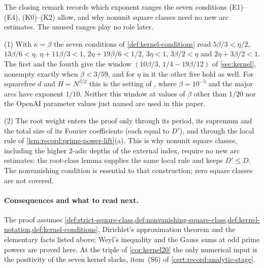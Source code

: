 The closing remark records which exponent ranges the seven
conditions (E1)--(E4), (K0)--(K2) allow, and why nonunit square
classes need no new arc estimates. The unused ranges play no role
later.

\begin{remark}\label{rem:record:K20-range}
(1) With $\kappa=\beta$ the seven conditions of \cref{def:kernel-conditions}
read $5\beta/3<\eta/2$, $13\beta/6<\eta$, $\eta+11\beta/3<1$,
$2\eta+19\beta/6<1/2$, $3\eta<1$, $3\beta/2<\eta$ and $2\eta+3\beta/2<1$. The
first and the fourth give the window $(10\beta/3,\,1/4-19\beta/12)$ of
\cref{sec:kernel}, nonempty exactly when $\beta<3/59$, and for $\eta$ in it the
other five hold as well. For squarefree $d$ and $H=N^{\beta/2}$ this is the
setting of \cite[Prop.~6.1]{OpenAI}, where $\beta=10^{-5}$ and the major arcs
have exponent $1/10$. Neither this window at values of $\beta$
other than $1/20$ nor the OpenAI parameter values just named
are used in this paper.

(2) The root weight enters the proof only through its period, its supremum
and the total size of its Fourier coefficients (each equal to $D'$), and
through the local rule of \cref{lem:record:prime-power-lift}(a). This is why
nonunit square classes, including the higher $2$-adic depths of the external
index, require no new arc estimates: the root-class lemma supplies the same
local rule and keeps $D'\le D$. The nonvanishing condition is essential to
that construction; zero square classes are not covered.
\end{remark}

\paragraph{Consequences and what to read next.}
The proof assumes \cref{def:strict-square-class,def:nonvanishing-square-class,def:kernel-notation,def:kernel-conditions},
Dirichlet's approximation
theorem and the elementary facts listed above; Weyl's inequality and the
Gauss sums at odd prime powers are proved here. At the triple of
\cref{cor:kernel20} the only numerical input is the positivity of the seven
kernel slacks, item~(S6) of \cref{cert:record:analytic-stage}.

\endgroup
